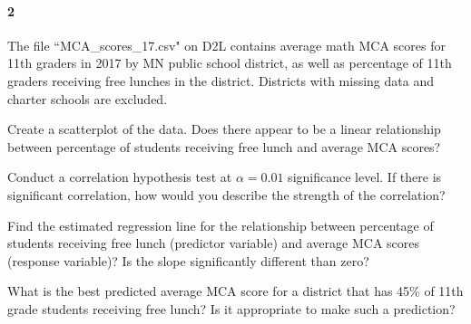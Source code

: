 \documentclass{article}
\begin{document}
\begin{flushleft}
\paragraph{2} The file ``MCA\_scores\_17.csv" on D2L contains average math MCA scores for 11th graders in 2017 by MN public school district, as well as percentage of 11th graders receiving free lunches in the district. Districts with missing data and charter schools are excluded.
\begin{enumalpha}
\item Create a scatterplot of the data. Does there appear to be a linear relationship between percentage of students receiving free lunch and average MCA scores?
\vspace{1.75in}
\item Conduct a correlation hypothesis test at $\alpha = 0.01$ significance level. If there is significant correlation, how would you describe the strength of the correlation?
\vspace{1.75in}
\item Find the estimated regression line for the relationship between percentage of students receiving free lunch (predictor variable) and average MCA scores (response variable)? Is the slope significantly different than zero?
\vspace{1.75in}
\item What is the best predicted average MCA score for a district that has 45\% of 11th grade students receiving free lunch? Is it appropriate to make such a prediction?
\end{enumalpha}



\end{flushleft}
\end{document}
